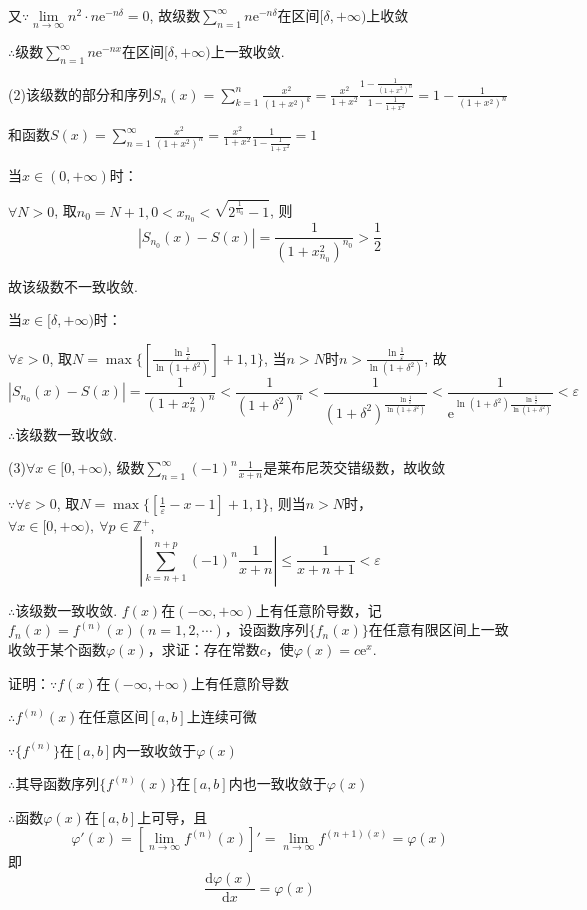 \documentclass[12pt,UTF8]{ctexart}
\newcommand\Lim[0]{\lim\limits_{n\rightarrow\infty}}
\newcommand\Ser[1]{\sum_{n=#1}^\infty}
\newcommand{\varSer}[3]{\sum_{#1=#2}^{#3}}
\newcommand{\me}[0]{\mathrm e}
\begin{document}
\begin{enumerate}
又$\because\Lim n^2\cdot n\me^{-n\delta}=0$, 故级数$\Ser{1}n\mathrm e^{-n\delta}$在区间$[\delta,+\infty)$上收敛

$\therefore$级数$\Ser{1}n\mathrm e^{-nx}$在区间$[\delta,+\infty)$上一致收敛.

(2)该级数的部分和序列$S_n(x)=\varSer k1n\frac{x^2}{(1+x^2)^k}=\frac{x^2}{1+x^2}\frac{1-\frac1{(1+x^2)^n}}{1-\frac1{1+x^2}}=1-\frac1{(1+x^2)^n}$

和函数$S(x)=\Ser{1}\frac{x^2}{(1+x^2)^n}=\frac{x^2}{1+x^2}\frac1{1-\frac1{1+x^2}}=1$

当$x\in(0,+\infty)$时：

$\forall N>0$, 取$n_0=N+1,0<x_{n_0}<\sqrt{2^{\frac1{n_0}}-1}$, 则
\[
|S_{n_0}(x)-S(x)|=\frac1{(1+x_{n_0}^2)^{n_0}}>\frac12
\]

故该级数不一致收敛.

当$x\in[\delta,+\infty)$时：

$\forall\varepsilon>0$, 取$N=\max\{[\frac{\ln\frac1{\varepsilon}}{\ln(1+\delta^2)}]+1,1\}$, 当$n>N$时$n>\frac{\ln\frac1{\varepsilon}}{\ln(1+\delta^2)}$, 故
\[
|S_{n_0}(x)-S(x)|=\frac1{(1+x_n^2)^n}<\frac1{(1+\delta^2)^n}<\frac1{(1+\delta^2)^{\frac{\ln\frac1{\varepsilon}}{\ln(1+\delta^2)}}}<\frac1{\me^{\ln(1+\delta^2)\frac{\ln\frac1{\varepsilon}}{\ln(1+\delta^2)}}}<\varepsilon
\]
$\therefore$该级数一致收敛.

(3)$\forall x\in[0,+\infty)$, 级数$\Ser{1}(-1)^n\frac1{x+n}$是莱布尼茨交错级数，故收敛

$\because\forall\varepsilon>0$, 取$N=\max\{[\frac1\varepsilon-x-1]+1,1\}$, 则当$n>N$时，$\forall x\in[0,+\infty),\ \forall p\in\mathbb Z^+$,
\[|\varSer k{n+1}{n+p}(-1)^n\frac1{x+n}|\leq\frac1{x+n+1}<\varepsilon\]

$\therefore$该级数一致收敛.
$f(x)$在$(-\infty,+\infty)$上有任意阶导数，记$f_n(x)=f^{(n)}(x)(n=1,2,\cdots)$，设函数序列$\{f_n(x)\}$在任意有限区间上一致收敛于某个函数$\varphi(x)$，求证：存在常数$c$，使$\varphi(x)=c\mathrm e^x$.

证明：$\because f(x)$在$(-\infty,+\infty)$上有任意阶导数

$\therefore f^{(n)}(x)$在任意区间$[a,b]$上连续可微

$\because\{f^{(n)}\}$在$[a,b]$内一致收敛于$\varphi(x)$

$\therefore$其导函数序列$\{f^{(n)}(x)\}$在$[a,b]$内也一致收敛于$\varphi(x)$

$\therefore$函数$\varphi(x)$在$[a,b]$上可导，且
\[
\varphi'(x)=[\Lim f^{(n)}(x)]'=\Lim f^{(n+1)(x)}=\varphi(x)
\]
即
\[\frac{\mathrm d\varphi(x)}{\mathrm dx}=\varphi(x)\]


\end{enumerate}
\end{document}
